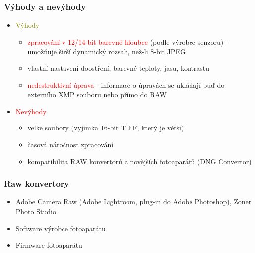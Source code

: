 \documentclass{beamer}
\begin{document}
	\begin{frame}
		\frametitle{Výhody a nevýhody}

			\begin{itemize}
	    	\item \textcolor{olive}{Výhody}
	    		\begin{itemize}
	    			\item \textcolor{red}{zpracování v 12/14-bit barevné hloubce} (podle výrobce senzoru) - umožňuje širší dynamický rozsah, než-li 8-bit JPEG
	    			\item vlastní nastavení doostření, barevné teploty, jasu, kontrastu
	    			\item \textcolor{red}{nedestruktivní úprava} - informace o úpravách se ukládají buď do externího XMP souboru nebo přímo do RAW
	    		\end{itemize}	
	    	\end{itemize}    	

	    	\begin{itemize}
    		\item \textcolor{red}{Nevýhody}
	    		\begin{itemize}
	    			\item velké soubory (vyjímka 16-bit TIFF, který je větší)
	    			\item časová náročnost zpracování
	    			\item kompatibilita RAW konvertorů a novějších fotoaparátů (DNG Convertor)
	    		\end{itemize}
			\end{itemize}

	\end{frame}
	
	
	\begin{frame}
		\frametitle{Raw konvertory}
		\begin{itemize}
	    	\item Adobe Camera Raw (Adobe Lightroom, plug-in do Adobe Photoshop), Zoner Photo Studio
	    	\item Software výrobce fotoaparátu
	    	\item Firmware fotoaparátu  			
	    \end{itemize}    	
	\end{frame}	
		
	
	
\end{document}
